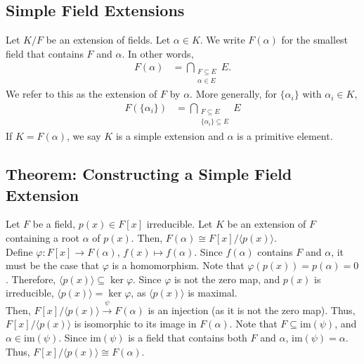 \documentclass[8pt]{extarticle}
\begin{document}
  \subsection{Simple Field Extensions}%
  Let $K/F$ be an extension of fields. Let $\alpha \in K$. We write $F(\alpha)$ for the smallest field that contains $F$ and $\alpha$. In other words,
  \begin{align*}
    F(\alpha) &= \bigcap_{\substack{F\subseteq E\\ \alpha\in E}} E.
  \end{align*}
  We refer to this as the extension of $F$ by $\alpha$. More generally, for $\{\alpha_i\}$ with $\alpha_i\in K$,
  \begin{align*}
    F(\{\alpha_i\}) &= \bigcap_{\substack{F\subseteq E\\\{\alpha_i\}\subseteq E}}E
  \end{align*}
  If $K = F(\alpha)$, we say $K$ is a simple extension and $\alpha$ is a primitive element.
  \subsection{Theorem: Constructing a Simple Field Extension}%
  Let $F$ be a field, $p(x) \in F[x]$ irreducible. Let $K$ be an extension of $F$ containing a root $\alpha$ of $p(x)$. Then, $F(\alpha) \cong F[x]/\langle p(x)\rangle$.\\

  Define $\varphi: F[x]\rightarrow F(\alpha)$, $f(x)\mapsto f(\alpha)$. Since $f(\alpha)$ contains $F$ and $\alpha$, it must be the case that $\varphi$ is a homomorphism. Note that $\varphi(p(x)) = p(\alpha) = 0$. Therefore, $\langle p(x)\rangle\subseteq \ker\varphi$. Since $\varphi$ is not the zero map, and $p(x)$ is irreducible, $\langle p(x)\rangle = \ker\varphi$, as $\langle p(x)\rangle$ is maximal.\\

  Then, $F[x]/\langle p(x)\rangle \xrightarrow{\psi} F(\alpha)$ is an injection (as it is not the zero map). Thus, $F[x]/\langle p(x)\rangle$ is isomorphic to its image in $F(\alpha)$. Note that $F\subseteq \text{im}(\psi)$, and $\alpha \in \text{im}(\psi)$. Since $\text{im}(\psi)$ is a field that contains both $F$ and $\alpha$, $\text{im}(\psi) = \alpha$. Thus, $F[x]/\langle p(x)\rangle \cong F(\alpha)$.
\end{document}
